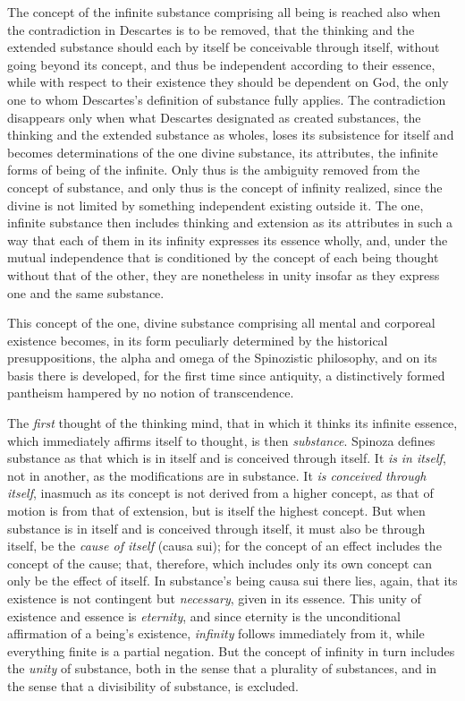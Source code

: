The concept of the infinite substance comprising all being is reached
also when the contradiction in Descartes is to be removed, that the
thinking and the extended substance should each by itself be conceivable
through itself, without going beyond its concept, and thus be
independent according to their essence, while with respect to their
existence they should be dependent on God, the only one to whom
Descartes's definition of substance fully applies. The contradiction
disappears only when what Descartes designated as created substances,
the thinking and the extended substance as wholes, loses its subsistence
for itself and becomes determinations of the one divine substance, its
attributes, the infinite forms of being of the infinite. Only thus is
the ambiguity removed from the concept of substance, and only thus is
the concept of infinity realized, since the divine is not limited by
something independent existing outside it. The one, infinite substance
then includes thinking and extension as its attributes in such a way
that each of them in its infinity expresses its essence wholly, and,
under the mutual independence that is conditioned by the concept of each
being thought without that of the other, they are nonetheless in unity
insofar as they express one and the same substance.

This concept of the one, divine substance comprising all mental and
corporeal existence becomes, in its form peculiarly determined by the
historical presuppositions, the alpha and omega of the Spinozistic
philosophy, and on its basis there is developed, for the first time
since antiquity, a distinctively formed pantheism hampered by no notion
of transcendence.

The \emph{first} thought of the thinking mind, that in which it thinks
its infinite essence, which immediately affirms itself to thought, is
then \emph{substance}. Spinoza defines substance as that which
is in itself and is conceived through itself. It \emph{is}
\emph{in itself}, not in another, as the modifications are in substance.
It \emph{is conceived through itself}, inasmuch as its concept is not
derived from a higher concept, as that of motion is from that of
extension, but is itself the highest concept. But when substance is in
itself and is conceived through itself, it must also be through itself,
be the \emph{cause of itself} (causa sui); for the concept of an effect
includes the concept of the cause; that, therefore, which includes only
its own concept can only be the effect of itself. In substance's being
causa sui there lies, again, that its existence is not contingent but
\emph{necessary}, given in its essence. This unity of existence and
essence is \emph{eternity}, and since eternity is the unconditional
affirmation of a being's existence, \emph{infinity} follows immediately
from it, while everything finite is a partial negation. But the concept
of infinity in turn includes the \emph{unity} of substance, both in the
sense that a plurality of substances, and in the sense that a
divisibility of substance, is excluded.


